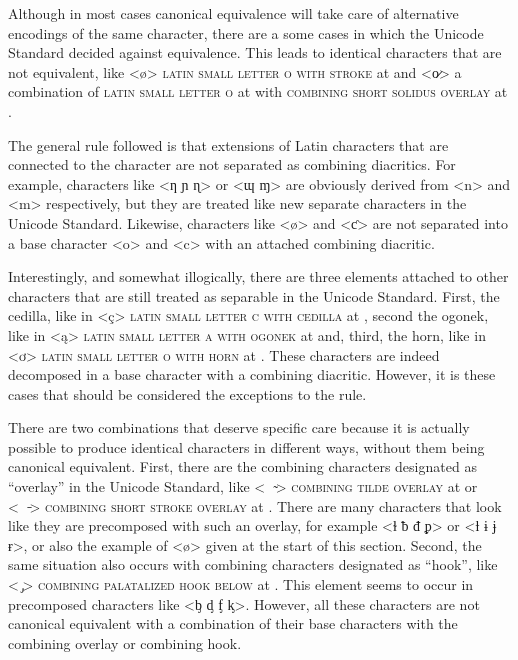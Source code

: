 Although in most cases canonical equivalence will take care of alternative
encodings of the same character, there are a some cases in which the Unicode
Standard decided against equivalence. This leads to identical characters that
are not equivalent, like <ø> \textsc{latin small letter o with stroke} at
 and <o̷> a combination of \textsc{latin small letter o} at 
with \textsc{combining short solidus overlay} at .

The general rule followed is that extensions of Latin characters that are
connected to the character are not separated as combining diacritics. For
example, characters like <ƞ ɲ ɳ> or <ɰ ɱ> are obviously derived from <n> and <m>
respectively, but they are treated like new separate characters in the Unicode
Standard. Likewise, characters like <ø> and <ƈ> are not separated into a base 
character <o> and <c> with an attached combining diacritic.

Interestingly, and somewhat illogically, there are three elements attached to
other characters that are still treated as separable in the Unicode Standard. First,
the cedilla, like in <ç> \textsc{latin small letter c with cedilla} at
, second the ogonek, like in <ą> \textsc{latin small letter a with
ogonek} at  and, third, the horn, like in <ơ> \textsc{latin small
letter o with horn} at . These characters are indeed decomposed in a 
base character with a combining diacritic. However, it is these cases that should be 
considered the exceptions to the rule.

There are two combinations that deserve specific care because it is actually 
possible to produce identical characters in different ways, without them being 
canonical equivalent. First, there are the
combining characters designated as ``overlay'' in the Unicode Standard, like    
<\ \ {\large  ̴}> \textsc{combining tilde overlay} at  or 
<\ \ {\large  ̵}> \textsc{combining short stroke overlay} at . 
There are many characters that look like they are 
precomposed with such an overlay, for example 
<{\small {}ɫ ᵬ ᵭ ᵱ}> or 
<{\small {}ƚ ɨ ɉ ɍ}>, or also the 
example of <ø> given at the start of this section. Second, the same situation also 
occurs with combining characters designated as ``hook'', like < {\large  ̡}> 
\textsc{combining palatalized hook below} at . This element seems to
occur in precomposed characters like <{\small {}ᶀ ᶁ ᶂ ᶄ}>. 
However, all these 
characters are not canonical equivalent with a combination of their base 
characters with the combining overlay or combining hook.

